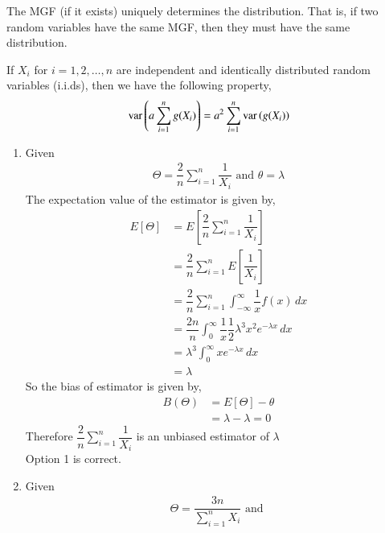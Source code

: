     \begin{lemma}
    \label{stats/4/mgf}
     The MGF (if it exists) uniquely determines the distribution. That is, if two random variables have the same MGF, then they must have the same distribution. 
    \end{lemma}
    \begin{lemma}
    \label{stats/4/var}
    If $X_{i}$ for $i = 1,2,\dots,n$ are independent and identically distributed random variables (i.i.ds), then we have the following property, 
       \begin{align}
        \text{var}\left( a\sum_{i=1}^{n}g(X_{i}) \right)=a^2 \sum_{i=1}^{n}\text{var}\left( g(X_{i}) \right)\label{stats/4/basic}
        \end{align}
    \end{lemma}
    \begin{enumerate}
        \item 
      Given 
     \begin{align}
         \Theta = \dfrac{2}{n} \sum_{i=1}^{n} \dfrac{1}{X_i} \text{  and  }
         \theta = \lambda
     \end{align}
    The expectation value of the estimator is given by, 
    \begin{align}
        E[\Theta ] &= E  \left[   \dfrac{2}{n} \sum_{i=1}^{n} \dfrac{1}{X_i}  \right] \\
        & = \dfrac{2}{n} \sum_{i=1}^{n} E  \left[ \dfrac{1}{X_i}  \right] \\
     & =  \dfrac{2}{n} \sum_{i=1}^{n} \int_{-\infty}^{\infty} \dfrac{1}{x} f(x)\,dx \\
        \label{stats/4/eq1}
       & = \dfrac{2n}{n} \int_{0}^{\infty} \dfrac{1}{x} \dfrac{1}{2} \lambda^3x^2e^{-\lambda x}\,dx \\
        & = \lambda^3  \int_{0}^{\infty}  x e^{-\lambda x}\,dx \\
        &= \lambda
    \end{align}
    So the bias of estimator is given by,
    \begin{align}
        B(\Theta) &= E[\Theta] - \theta  \\
        &= \lambda - \lambda = 0
    \end{align}
    Therefore $\dfrac{2}{n} \sum_{i=1}^{n} \dfrac{1}{X_i} $ is an unbiased estimator of $ \lambda$ \\
    Option 1 is correct. 
    \item
    Given
     \begin{align}
         \Theta = \dfrac{3n}{\sum_{i=1}^{n} X_i } \text{  and  }

\end{align}
\end{enumerate}
